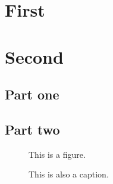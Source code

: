 \documentclass{utthesis}
\begin{document}




\begin{appendix}

\chapter{First}
\lipsum[3]

\chapter{Second}
\section{Part one}
\lipsum[3]
\section{Part two}
\begin{figure}
This is a figure.
\caption[That]{This is also a caption.}
\end{figure}

\end{appendix}

\backmatter

\printindex

\cleardoublepage
{}

\end{document}
